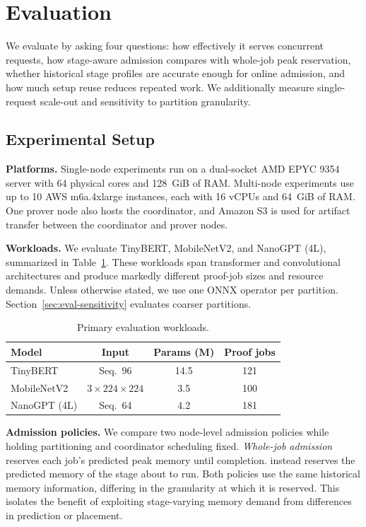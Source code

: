 \section{Evaluation}
\label{sec:evaluation}

We evaluate \TITLE{} by asking four questions: how effectively it serves concurrent requests, how stage-aware admission compares with whole-job peak reservation, whether historical stage profiles are accurate enough for online admission, and how much setup reuse reduces repeated work. We additionally measure single-request scale-out and sensitivity to partition granularity.

\subsection{Experimental Setup}
\label{sec:eval-setup}

\textbf{Platforms.}
Single-node experiments run on a dual-socket AMD EPYC 9354 server with 64 physical cores and 128~GiB of RAM. Multi-node experiments use up to 10 AWS m6a.4xlarge instances, each with 16 vCPUs and 64~GiB of RAM. One prover node also hosts the coordinator, and Amazon S3 is used for artifact transfer between the coordinator and prover nodes.

\textbf{Workloads.}
We evaluate TinyBERT, MobileNetV2, and NanoGPT (4L), summarized in Table~\ref{tab:models}. These workloads span transformer and convolutional architectures and produce markedly different proof-job sizes and resource demands. Unless otherwise stated, we use one ONNX operator per partition. Section~\ref{sec:eval-sensitivity} evaluates coarser partitions.

\begin{table}[t]
\centering
\setlength{\tabcolsep}{3pt}
\renewcommand{\arraystretch}{1.12}
\begin{tabular}{@{}lccc@{}}
\toprule
Model & Input & Params (M) & Proof jobs \\
\midrule
TinyBERT       & Seq.\ 96              & 14.5 & 121 \\
MobileNetV2    & $3\times224\times224$ & 3.5  & 100 \\
NanoGPT (4L)   & Seq.\ 64              & 4.2  & 181 \\
\bottomrule
\end{tabular}
\caption{Primary evaluation workloads.}
\label{tab:models}
\end{table}

\textbf{Admission policies.}
We compare two node-level admission policies while holding partitioning and coordinator scheduling fixed. \emph{Whole-job admission} reserves each job's predicted peak memory until completion. \emph{\TITLE{}} instead reserves the predicted memory of the stage about to run. Both policies use the same historical memory information, differing in the granularity at which it is reserved. This isolates the benefit of exploiting stage-varying memory demand from differences in prediction or placement.

